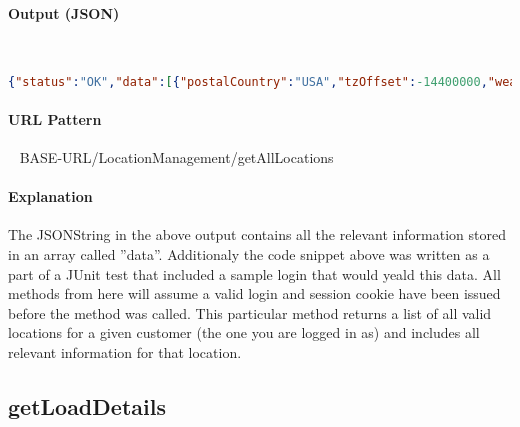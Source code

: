 \documentclass[
10pt, %
letterpaper, %
oneside, %
headinclude,footinclude, %
BCOR5mm, %
]{scrartcl}
\begin{document}
\paragraph{Output (JSON)}~
\begin{lstlisting}[language=json]
{"status":"OK","data":[{"postalCountry":"USA","tzOffset":-14400000,"weatherStationRef":1332878257808,"postalState":"MA","postalZip":"02054","id":750,"customerId":13,"jsonobjectName":"LocationDetails","name":"Millis","acquisitionZone":"DEFAULT","postalCity":"Millis","active":true,"longitude":-71.354,"postalStreet1":"6 Milliston Rd","latitude":42.167,"timeZoneName":"America/New_York","postalStreet3":null,"postalStreet2":null},{"postalCountry":"USA","tzOffset":-14400000,"weatherStationRef":1332878257808,"postalState":"MA","postalZip":null,"id":751,"customerId":13,"jsonobjectName":"LocationDetails","name":"Easton","acquisitionZone":"DEFAULT","postalCity":"Easton","active":true,"longitude":-71.095,"postalStreet1":null,"latitude":42.088,"timeZoneName":"America/New_York","postalStreet3":null,"postalStreet2":null}],"version":1}
\end{lstlisting}


\paragraph{URL Pattern} 
~\newline
BASE-URL/LocationManagement/getAllLocations

\paragraph{Explanation} The JSONString in the above output contains all the relevant information stored in an array called ''data''. Additionaly the code snippet above was written as a part of a JUnit test that included a sample login that would yeald this data. All methods from here will assume a valid login and session cookie have been issued before the method was called. This particular method returns a list of all valid locations for a given customer (the one you are logged in as) and includes all relevant information for that location. 



\subsection{\textbf{getLoadDetails}}
\end{document}
